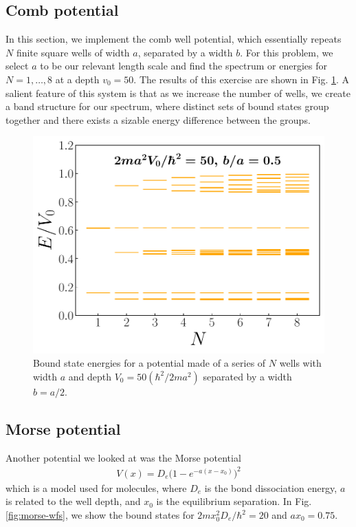 \subsection{Comb potential}
\label{ssec:comb-potential}

In this section, we implement the comb well potential, which essentially repeats $N$ finite square wells of width $a$, separated by a width $b$.
For this problem, we select $a$ to be our relevant length scale and find the spectrum or energies for $N = 1,\ldots,8$ at a depth $v_0 = 50$.
The results of this exercise are shown in Fig. \ref{fig:comb-spectrum}.
A salient feature of this system is that as we increase the number of wells, we create a band structure for our spectrum, where distinct sets of bound states group together and there exists a sizable energy difference between the groups.


\begin{figure}[h!tb]
    \centering
    \includegraphics[width=0.5\linewidth]{comb_spectrum.pdf}
    \caption{Bound state energies for a potential made of a series of $N$ wells with width $a$ and depth $V_0 = 50 (\hbar^2 / 2 m a^2)$ separated by a width $b = a/2$.}
    \label{fig:comb-spectrum}
\end{figure}



\subsection{Morse potential}
\label{ssec:morse-potential}

Another potential we looked at was the Morse potential
\begin{align}
    V(x) = D_{e} \Big( 1 - e^{-a(x - x_0)} \Big)^2
\end{align}
which is a model used for molecules, where $D_{e}$ is the bond dissociation energy, $a$ is related to the well depth, and $x_0$ is the equilibrium separation.
In Fig. \ref{fig:morse-wfs}, we show the bound states for $2 m x_0^2 D_{e} / \hbar^2 = 20$ and $a x_0 = 0.75$.

